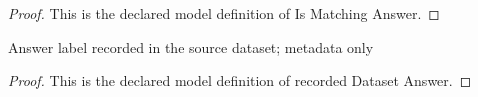 \begin{proof}
  This is the declared model definition of Is Matching Answer.
\end{proof}
\begin{definition}
  \label{def:physics:phyx-mini-0901:phyxminiproblems-problemphyxmini0901-recordeddatasetanswer}
  Answer label recorded in the source dataset; metadata only
\end{definition}
\begin{proof}
  This is the declared model definition of recorded Dataset Answer.
\end{proof}
